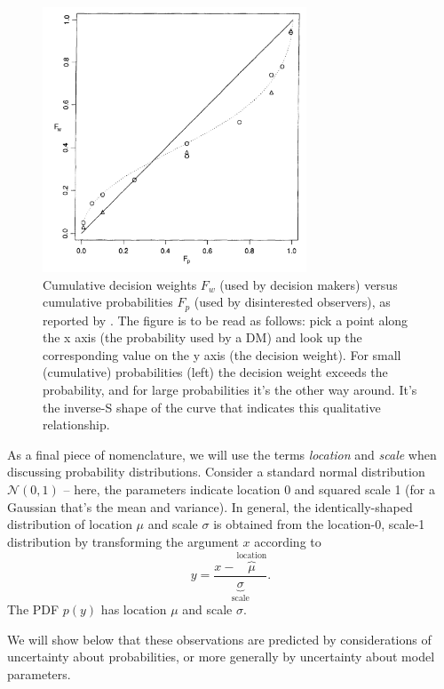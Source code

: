 \documentclass[11pt]{article}
\newcommand{\flabel}[1]{\label{fig:#1}}
\newcommand{\be}{\begin{equation}}
\newcommand{\ee}{\end{equation}}
\newcommand{\ND}{\mathcal{N}} %
\numberwithin{equation}{section}
\begin{document}
\begin{figure}[!htb]
\centering
\includegraphics[width=0.7\textwidth]{./figs/TK1992.PNG}
\caption{Cumulative decision weights $F_w$ (used by decision makers) versus cumulative probabilities $F_p$ (used by disinterested observers), as reported by \citet{TverskyKahneman1992}. The figure is to be read as follows: pick a point along the x axis (the probability used by a DM) and look up the corresponding value on the y axis (the decision weight). For small (cumulative) probabilities (left) the decision weight exceeds the probability, and for large probabilities it's the other way around. It's the inverse-S shape of the curve that indicates this qualitative relationship.}
\flabel{TK1992}
\end{figure}

As a final piece of nomenclature, we will use the terms {\it location} and {\it scale} when discussing probability distributions. Consider a standard normal distribution $\ND(0,1)$ -- here, the parameters indicate location 0 and squared scale 1 (for a Gaussian that's the mean and variance). In general, the identically-shaped distribution of location $\mu$ and scale $\sigma$ is obtained from the location-0, scale-1 distribution by transforming the argument $x$ according to 
\be
y=\frac{x-\overbrace{\mu}^{\text{location}}}{\underbrace{\sigma}_{\text{scale}}}.
\ee
The PDF $p(y)$ has location $\mu$ and scale $\sigma$.

We will show below that these observations are predicted by considerations of uncertainty about probabilities, or more generally by uncertainty about model parameters. 

%
%
\end{document}
